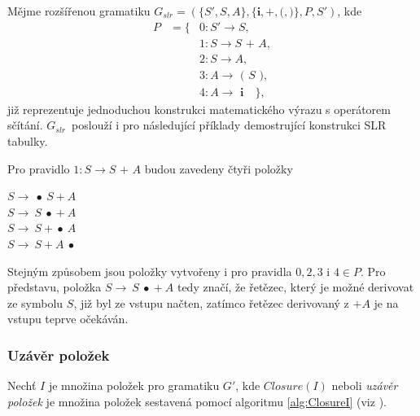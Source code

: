 \begin{priklad} \label{prikladPolozky}
  Mějme rozšířenou gramatiku $G_{slr} = (\{S', S, A\}, \{\textbf{i}, \textbf{+}, \textbf{(}, \textbf{)} \}, P, S')$, kde
  \begin{eqnarray*}
    P & = \{ & 0\!: S' \rightarrow S, \\
      &      & 1\!: S \rightarrow S \textbf{ + } A, \\
      &      & 2\!: S \rightarrow A, \\
      &      & 3\!: A \rightarrow \textbf{ ( } S \textbf{ )}, \\
      &      & 4\!: A \rightarrow \textbf{ i}\quad\},
  \end{eqnarray*}
  již reprezentuje jednoduchou konstrukci matematického výrazu s operátorem sčítání. $G_{slr}$~poslouží i pro následující příklady demostrující konstrukci SLR tabulky.

  Pro pravidlo $1\!: S \rightarrow S \textbf{ + } A$ budou zavedeny čtyři položky
  \begin{center}
    $S \rightarrow\!\  \bullet\  S\  \textbf{+}\  A$ \\
    $S \rightarrow\!\  S\!\ \bullet\!\ \textbf{+}\  A$ \\
    $S \rightarrow\!\  S\  \textbf{+}\!\ \bullet\!\ A$ \\
    $S \rightarrow\!\  S\  \textbf{+}\  A\  \bullet$
  \end{center}
  Stejným způsobem jsou položky vytvořeny i pro pravidla $0, 2, 3$ i $4 \in P$. Pro představu, položka $S \rightarrow\!\  S\!\ \bullet\!\ \textbf{+}\  A$ tedy značí, že
  řetězec, který je možné derivovat ze symbolu $S$, již byl ze vstupu načten, zatímco řetězec derivovaný z $\textbf{+} A$ je na vstupu teprve očekáván.
\end{priklad}

\subsubsection{Uzávěr položek}
Nechť $I$ je množina položek pro gramatiku $G'$, kde $Closure(I)$ neboli \emph{uzávěr položek} je množina položek sestavená pomocí algoritmu \ref{alg:ClosureI} (viz \cite{Alfred:2007:Compilers}).

